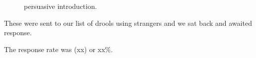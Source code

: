 \begin{figure}[h]
    \centering
    \caption{persuasive introduction.}
    \label{fig:persuasive_introduction}
\end{figure}


These were sent to our list of drools using strangers and we sat back and awaited response.

The response rate was  (xx) or xx\%.


